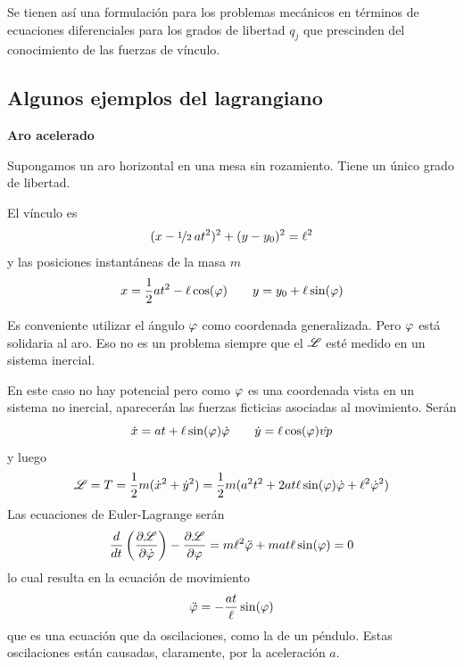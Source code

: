 \documentclass[10pt,oneside]{CBFT_book}
\begin{document}
Se tienen así una formulación para los problemas mecánicos en términos de ecuaciones diferenciales para los
grados de libertad $q_j$ que prescinden del conocimiento de las fuerzas de vínculo.

\subsection{Algunos ejemplos del lagrangiano}

\begin{ejemplo}{\bfseries Aro acelerado }


Supongamos un aro horizontal en una mesa sin rozamiento. Tiene un único grado de libertad.

El vínculo es
\[
	(x - \nicefrac{1}{2} \: at^2)^2 + (y-y_0 )^2 = \ell^2
\]
y las posiciones instantáneas de la masa $ m $
\[
	x = \frac{1}{2}at^2 - \ell \cos(\varphi) \qquad  y = y_0 + \ell \sin(\varphi)
\]

Es conveniente utilizar el ángulo $\varphi$ como coordenada generalizada. Pero $\varphi$ está solidaria al aro.
Eso no es un problema siempre que el $\mathscr{L}$ esté medido en un sistema inercial.

En este caso no hay potencial pero como $\varphi$ es una coordenada vista en un sistema no inercial, aparecerán
las fuerzas ficticias asociadas al movimiento.
Serán
\[
	\dot{x} = at + \ell \sin(\varphi) \dot{\varphi} \qquad \dot{y} = \ell \cos(\varphi) \dot{vp}
\]
y luego 
\[
	\mathscr{L} = T = \frac{1}{2} m (\dot{x}^2 + \dot{y}^2 ) = \frac{1}{2} m
	(a^2 t^2 + 2at\ell\sin(\varphi)\dot{\varphi}+\ell^2\dot{\varphi}^2)
\]
Las ecuaciones de Euler-Lagrange serán 
\[
	\frac{d^{\hspace{-0.05em}} {}}{d {t}^{\hspace{-0.05em}}}\left( \frac{\partial^{\hspace{-0.05em}} {\mathscr{L}}}{\partial {\dot{\varphi}}^{\hspace{-0.05em}}}\right) - \frac{\partial^{\hspace{-0.05em}} {\mathscr{L}}}{\partial {\varphi}^{\hspace{-0.05em}}} = 
	m \ell^2 \ddot{\varphi} + mat\ell \sin(\varphi) = 0
\]
lo cual resulta en la ecuación de movimiento
\[
	\ddot{\varphi} = - \frac{at}{\ell} \sin(\varphi) 
\]
que es una ecuación que da oscilaciones, como la de un péndulo. Estas oscilaciones están causadas, claramente,
por la aceleración $a$.



\end{ejemplo}
\end{document}
